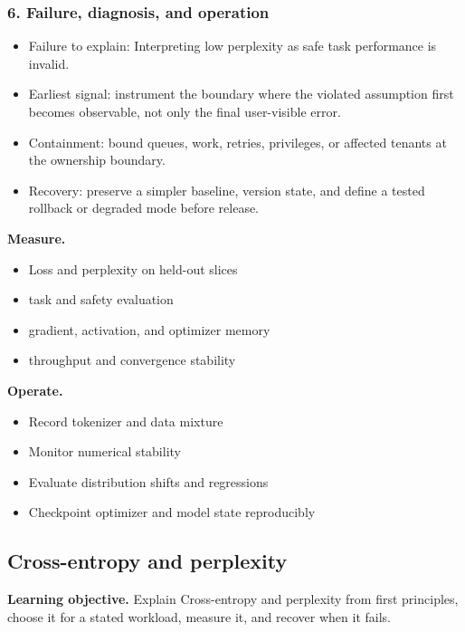 \subsubsection*{6. Failure, diagnosis, and operation}
\begin{itemize}
\item Failure to explain: Interpreting low perplexity as safe task performance is invalid.
\item Earliest signal: instrument the boundary where the violated assumption first becomes observable, not only the final user-visible error.
\item Containment: bound queues, work, retries, privileges, or affected tenants at the ownership boundary.
\item Recovery: preserve a simpler baseline, version state, and define a tested rollback or degraded mode before release.
\end{itemize}
\textbf{Measure.}\begin{itemize}
\item Loss and perplexity on held-out slices
\item task and safety evaluation
\item gradient, activation, and optimizer memory
\item throughput and convergence stability
\end{itemize}
\textbf{Operate.}\begin{itemize}
\item Record tokenizer and data mixture
\item Monitor numerical stability
\item Evaluate distribution shifts and regressions
\item Checkpoint optimizer and model state reproducibly
\end{itemize}
\subsection{Cross-entropy and perplexity}
\textbf{Learning objective.} Explain Cross-entropy and perplexity from first principles, choose it for a stated workload, measure it, and recover when it fails.
